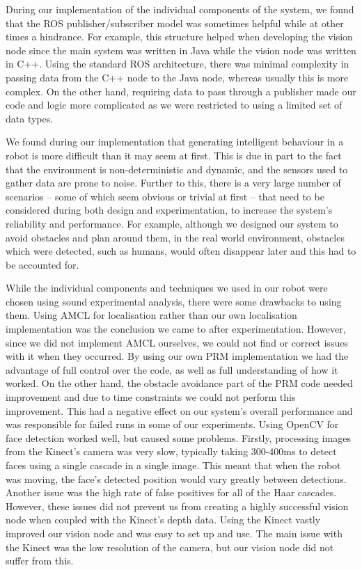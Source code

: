 \documentclass[conference]{IEEEtran}
\begin{document}
During our implementation of the individual components of the system, we found that the ROS publisher/subscriber model was sometimes helpful while at other times a hindrance. For example, this structure helped when developing the vision node since the main system was written in Java while the vision node was written in C++. Using the standard ROS architecture, there was minimal complexity in passing data from the C++ node to the Java node, whereas usually this is more complex. On the other hand, requiring data to pass through a publisher made our code and logic more complicated as we were restricted to using a limited set of data types.

We found during our implementation that generating intelligent behaviour in a robot is more difficult than it may seem at first. This is due in part to the fact that the environment is non-deterministic and dynamic, and the sensors used to gather data are prone to noise. Further to this, there is a very large number of scenarios -- some of which seem obvious or trivial at first -- that need to be considered during both design and experimentation, to increase the system's reliability and performance. For example, although we designed our system to avoid obstacles and plan around them, in the real world environment, obstacles which were detected, such as humans, would often disappear later and this had to be accounted for.

While the individual components and techniques we used in our robot were chosen using sound experimental analysis, there were some drawbacks to using them. Using AMCL for localisation rather than our own localisation implementation was the conclusion we came to after experimentation. However, since we did not implement AMCL ourselves, we could not find or correct issues with it when they occurred. By using our own PRM implementation we had the advantage of full control over the code, as well as full understanding of how it worked. On the other hand, the obstacle avoidance part of the PRM code needed improvement and due to time constraints we could not perform this improvement. This had a negative effect on our system's overall performance and was responsible for failed runs in some of our experiments. Using OpenCV for face detection worked well, but caused some problems. Firstly, processing images from the Kinect's camera was very slow, typically taking 300-400ms to detect faces using a single cascade in a single image. This meant that when the robot was moving, the face's detected position would vary greatly between detections. Another issue was the high rate of false positives for all of the Haar cascades. However, these issues did not prevent us from creating a highly successful vision node when coupled with the Kinect's depth data. Using the Kinect vastly improved our vision node and was easy to set up and use. The main issue with the Kinect was the low resolution of the camera, but our vision node did not suffer from this.
\end{document}
